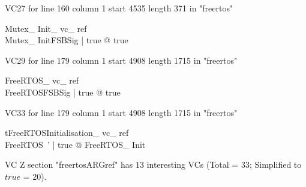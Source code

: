 \documentclass{article}
\begin{document}
VC27 for line 160 column 1 start 4535 length 371 in "freertos"
\begin{theorem}{ Mutex\_ Init\_ vc\_ ref}\\
 \exists Mutex\_ InitFSBSig | true @ true \\

\end{theorem}

VC29 for line 179 column 1 start 4908 length 1715 in "freertos"
\begin{theorem}{ FreeRTOS\_ vc\_ ref}\\
 \exists FreeRTOSFSBSig | true @ true \\

\end{theorem}

VC33 for line 179 column 1 start 4908 length 1715 in "freertos"
\begin{theorem}{ tFreeRTOSInitialisation\_ vc\_ ref}\\
 \exists FreeRTOS~' | true @ FreeRTOS\_ Init \\

\end{theorem}



 VC Z section "freertosARGref" has $13$ interesting VCs (Total = 33; Simplified to $true$ = 20).



\end{document}
